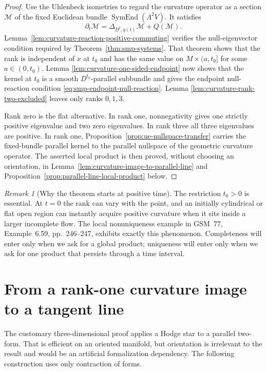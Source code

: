 \documentclass[10pt]{coll-l}
\theoremstyle{definition}
\theoremstyle{remark}
\newtheorem{remark}[theorem]{Remark}
\numberwithin{section}{chapter}
\numberwithin{equation}{chapter}
\begin{document}
\begin{proof}
Use the Uhlenbeck isometries to regard the curvature operator as a section
$\mathcal M$ of the fixed Euclidean bundle
$\operatorname{SymEnd}(\Lambda^2V)$.  It satisfies
\[
                 \partial_t\mathcal M
                 =\Delta_{D^t,g(t)}\mathcal M+Q(\mathcal M).
\]
Lemma~\ref{lem:curvature-reaction-positive-commuting} verifies the
null-eigenvector condition required by Theorem~\ref{thm:smp-systems}.
That theorem shows that the rank is independent of $x$ at $t_0$ and has
the same value on $M\times(a,t_0]$ for some $a\in(0,t_0)$.  Lemma
\ref{lem:curvature-one-sided-endpoint} now shows that the kernel at $t_0$
is a smooth $D^{t_0}$-parallel subbundle and gives the endpoint
null-reaction condition
\eqref{eq:smp-endpoint-null-reaction}.  Lemma
\ref{lem:curvature-rank-two-excluded} leaves only ranks $0,1,3$.

Rank zero is the flat alternative.  In rank one, nonnegativity gives one
strictly positive eigenvalue and two zero eigenvalues.  In rank three all
three eigenvalues are positive.  In rank one,
Proposition~\ref{prop:ue-nullspace-transfer} carries the fixed-bundle
parallel kernel to the parallel nullspace of the geometric curvature
operator.  The asserted local product is then proved, without choosing an
orientation, in
Lemma~\ref{lem:curvature-image-to-parallel-line} and
Proposition~\ref{prop:parallel-line-local-product} below.
\end{proof}

\begin{remark}[Why the theorem starts at positive time]
\label{rem:curvature-trichotomy-positive-time}
The restriction $t_0>0$ is essential.  At $t=0$ the rank can vary with the
point, and an initially cylindrical or flat open region can instantly acquire
positive curvature when it sits inside a larger incomplete flow.  The local
nonuniqueness example in GSM~77, Example~6.59, pp.~246--247, exhibits
exactly this phenomenon.  Completeness will enter only when we ask for a
global product; uniqueness will enter only when we ask for one product that
persists through a time interval.
\end{remark}

\section{From a rank-one curvature image to a tangent line}
\label{sec:curvature-rank-one-line}

The customary three-dimensional proof applies a Hodge star to a parallel
two-form.  That is efficient on an oriented manifold, but orientation is
irrelevant to the result and would be an artificial formalization
dependency.  The following construction uses only contraction of forms.
\end{document}
